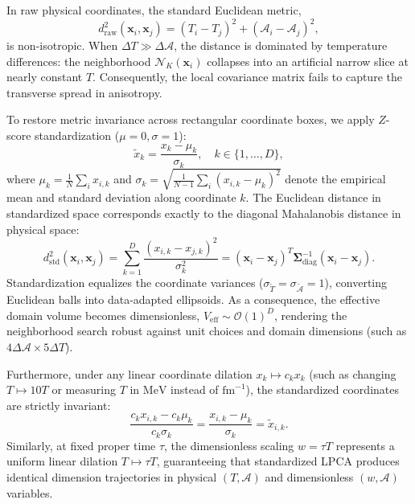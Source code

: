 \documentclass[11pt,a4paper]{article}
\begin{document}
In raw physical coordinates, the standard Euclidean metric,
\begin{equation}
    d_{\mathrm{raw}}^2(\mathbf{x}_i, \mathbf{x}_j) = (T_i - T_j)^2 + (\mathcal{A}_i - \mathcal{A}_j)^2,
\end{equation}
is non-isotropic. When $\Delta T \gg \Delta \mathcal{A}$, the distance is dominated by temperature differences: the neighborhood $\mathcal{N}_K(\mathbf{x}_i)$ collapses into an artificial narrow slice at nearly constant $T$. Consequently, the local covariance matrix fails to capture the transverse spread in anisotropy.

To restore metric invariance across rectangular coordinate boxes, we apply $Z$-score standardization ($\mu=0, \sigma=1$):
\begin{equation}
    \tilde{x}_k = \frac{x_k - \mu_k}{\sigma_k}, \quad k \in \{1, \dots, D\},
\end{equation}
where $\mu_k = \frac{1}{N}\sum_i x_{i,k}$ and $\sigma_k = \sqrt{\frac{1}{N-1}\sum_i (x_{i,k} - \mu_k)^2}$ denote the empirical mean and standard deviation along coordinate $k$. The Euclidean distance in standardized space corresponds exactly to the diagonal Mahalanobis distance in physical space:
\begin{equation}
    d_{\mathrm{std}}^2(\mathbf{x}_i, \mathbf{x}_j) = \sum_{k=1}^D \frac{(x_{i,k} - x_{j,k})^2}{\sigma_k^2} = (\mathbf{x}_i - \mathbf{x}_j)^T \mathbf{\Sigma}_{\mathrm{diag}}^{-1} (\mathbf{x}_i - \mathbf{x}_j).
\end{equation}
Standardization equalizes the coordinate variances ($\sigma_{\tilde{T}} = \sigma_{\tilde{\mathcal{A}}} = 1$), converting Euclidean balls into data-adapted ellipsoids. As a consequence, the effective domain volume becomes dimensionless, $V_{\mathrm{eff}} \sim \mathcal{O}(1)^D$, rendering the neighborhood search robust against unit choices and domain dimensions (such as $4\Delta\mathcal{A} \times 5\Delta T$).

Furthermore, under any linear coordinate dilation $x_k \mapsto c_k x_k$ (such as changing $T \mapsto 10T$ or measuring $T$ in $\mathrm{MeV}$ instead of $\mathrm{fm}^{-1}$), the standardized coordinates are strictly invariant:
\begin{equation}
    \frac{c_k x_{i,k} - c_k \mu_k}{c_k \sigma_k} = \frac{x_{i,k} - \mu_k}{\sigma_k} = \tilde{x}_{i,k}.
\end{equation}
Similarly, at fixed proper time $\tau$, the dimensionless scaling $w = \tau T$ represents a uniform linear dilation $T \mapsto \tau T$, guaranteeing that standardized LPCA produces identical dimension trajectories in physical $(T, \mathcal{A})$ and dimensionless $(w, \mathcal{A})$ variables.
\end{document}
